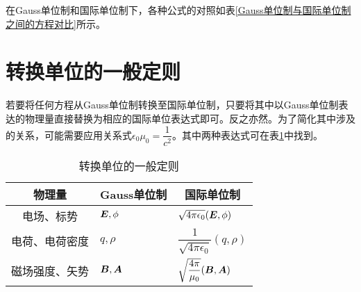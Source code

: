 在Gauss单位制和国际单位制下，各种公式的对照如表\ref{Gauss单位制与国际单位制之间的方程对比}所示。

\section{转换单位的一般定则}

若要将任何方程从Gauss单位制转换至国际单位制，只要将其中以Gauss单位制表达的物理量直接替换为相应的国际单位表达式即可。反之亦然。为了简化其中涉及的关系，可能需要应用关系式$\epsilon_0\mu_0=\dfrac{1}{c^2}$。其中两种表达式可在表\ref{转换单位的一般定则}中找到。

\begin{table}[htbp]
  \centering
  \caption{转换单位的一般定则}
  \label{转换单位的一般定则}
    \begin{tabular}{|c|r|r|}
    \hline
    物理量  & \multicolumn{1}{c|}{Gauss单位制} & \multicolumn{1}{c|}{国际单位制} \bigstrut\\
    \hline
    电场、标势 & \multicolumn{1}{l|}{$\boldsymbol{E}, \phi$} & \multicolumn{1}{l|}{$\sqrt{4\pi\epsilon_0}(\boldsymbol{E}, \phi)$} \bigstrut\\
    \hline
    电荷、电荷密度 & \multicolumn{1}{l|}{$q, \rho$} & \multicolumn{1}{l|}{$\dfrac{1}{\sqrt{4\pi\epsilon_0}}(q, \rho)$} \bigstrut\\
    \hline
    磁场强度、矢势 & \multicolumn{1}{l|}{$\boldsymbol{B}, \boldsymbol{A}$} & \multicolumn{1}{l|}{$\sqrt{\dfrac{4\pi}{\mu_0}}(\boldsymbol{B}, \boldsymbol{A})$} \bigstrut\\
    \hline
    \end{tabular}%
\end{table}%
